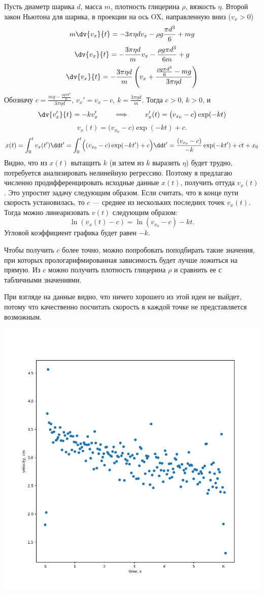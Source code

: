 \documentclass[a4paper, 12pt]{article}
\begin{document}
Пусть диаметр шарика $d$, масса $m$, плотность глицерина $\rho$, вязкость $\eta$.
Второй закон Ньютона для шарика, в проекции на ось OX, направленную вниз ($v_x > 0$)
\[ m \dv{v_x}{t} = -3 \pi \eta d v_x - \rho g \frac{\pi d^3}6 + mg \]
\[ \dv{v_x}{t} = -\frac{3 \pi \eta d}m v_x - \frac{\rho g \pi d^3}{6 m} + g \]
\[ \dv{v_x}{t} = -\frac{3 \pi \eta d}m \left(v_x + \frac{\frac{\rho g \pi d^3}{6} - mg}{3 \pi \eta d}\right) \]
Обозначу $c = \frac{mg - \frac{\rho g \pi d^3}{6}}{3 \pi \eta d}$, $v_x' = v_x - c$, $k = \frac{3 \pi \eta d}m$.
Тогда $c > 0$, $k > 0$, и
\[ \dv{v_x'}{t} = -k v_x' \qquad\implies\qquad v_x'(t) = \bigl(v_{x_0} - c\bigr)\exp(-kt) \]
\[ v_x(t) = \bigl(v_{x_0} -  c\bigr)\exp(-kt) + c .\] 
\[
x(t) = \int_{0}^t v_x(t') \dd t' = \int_{0}^t \Bigl((v_{x_0} -  c)\exp(-kt') + c\Bigr) \dd t' =
	   \frac{(v_{x_0} -  c)}{-k}\exp(-kt') + ct + x_0
\]
Видно, что из $x(t)$ вытащить $k$ (и затем из $k$ выразить $\eta$) будет трудно, потребуется анализировать нелинейную регрессию.
Поэтому я предлагаю численно продифференцировать исходные данные $x(t)$, получить оттуда $v_x(t)$.
Это упростит задачу следующим образом.
Если считать, что в конце пути скорость установилась, то $c$ --- среднее из нескольких последних точек $v_x(t)$.
Тогда можно линеаризовать $v(t)$ следующим образом:
\[ \ln( v_x(t) - c ) = \ln(v_{x_0} -  c) - k t .\] 
Угловой коэффициент графика будет равен $-k$.

Чтобы получить $c$ более точно, можно попробовать поподбирать такие значения, при которых прологарифмированная зависимость будет лучше ложиться на прямую.
Из $c$ можно получить плотность глицерина $\rho$ и сравнить ее с табличными значениями.

При взгляде на данные видно, что ничего хорошего из этой идеи не выйдет, потому что качественно посчитать скорость в каждой точке не представляется возможным.
\begin{center}
\includegraphics[width=0.6\linewidth]{bad_numericall_differentiation.png}
\end{center}
\end{document}
